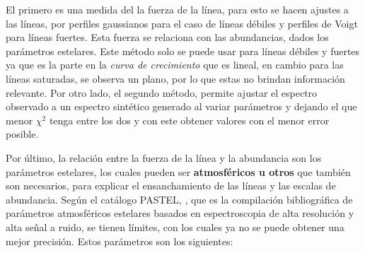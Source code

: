 \documentclass[12pt,oneside,openany,letter]{book}
\begin{document}
\noindent El primero es una medida del la fuerza de la línea, para esto se hacen ajustes a las líneas, por perfiles gaussianos para el caso de líneas débiles y perfiles de Voigt para líneas fuertes. Esta fuerza se relaciona con las abundancias, dados los parámetros estelares. Este método solo se puede usar para líneas débiles y fuertes ya que es la parte en la \textit{curva de crecimiento} que es lineal, en cambio para las líneas saturadas, se observa un plano, por lo que estas no brindan información relevante. Por otro lado, el segundo método, permite ajustar el espectro observado a un espectro sintético generado al variar parámetros y dejando el que menor $\chi^2$ tenga entre los dos y con este obtener valores con el menor error posible.

\noindent Por último, la relación entre la fuerza de la línea y la abundancia son los parámetros estelares, los cuales pueden ser \textbf{atmosféricos u otros} que también son necesarios, para explicar el ensanchamiento de las líneas y las escalas de abundancia. Según el catálogo PASTEL, \citep{soubiran2016pastel}, que es la compilación bibliográfica de parámetros atmosféricos estelares basados en espectroscopia de alta resolución y alta señal a ruido, se tienen límites, con los cuales ya no se puede obtener una mejor precisión. Estos parámetros son los siguientes:
\end{document}
